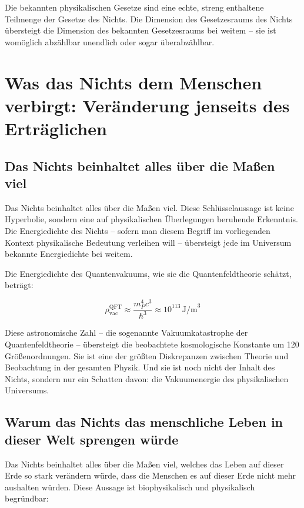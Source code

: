 ﻿\documentclass[12pt,a4paper]{report}
\begin{document}
Die bekannten physikalischen Gesetze sind eine echte, streng enthaltene Teilmenge der Gesetze des Nichts. Die Dimension des Gesetzesraums des Nichts übersteigt die Dimension des bekannten Gesetzesraums bei weitem -- sie ist womöglich abzählbar unendlich oder sogar überabzählbar.

\section{Was das Nichts dem Menschen verbirgt: Verän\-derung jenseits des Erträglichen}

\subsection{Das Nichts beinhaltet alles über die Maßen viel}

Das Nichts beinhaltet alles über die Maßen viel. Diese Schlüsselaussage ist keine Hyperbolie, sondern eine auf physikalischen Überlegungen beruhende Erkenntnis. Die Energiedichte des Nichts -- sofern man diesem Begriff im vorliegenden Kontext physikalische Bedeutung verleihen will -- übersteigt jede im Universum bekannte Energiedichte bei weitem.

Die Energiedichte des Quantenvakuums, wie sie die Quantenfeldtheorie schätzt, beträgt:

\begin{equation}
	\rho_{\text{vac}}^{\text{QFT}} \approx \frac{m_P^4 c^3}{\hbar^3} \approx 10^{113}\,\text{J/m}^3
	\label{eq:vakuum_energie}
\end{equation}

Diese astronomische Zahl -- die sogenannte \glqq Vakuumkatastrophe\grqq{} der Quantenfeldtheorie -- übersteigt die beobachtete kosmologische Konstante um 120 Größenordnungen. Sie ist eine der größten Diskrepanzen zwischen Theorie und Beobachtung in der gesamten Physik. Und sie ist noch nicht der Inhalt des Nichts, sondern nur ein Schatten davon: die Vakuumenergie des physikalischen Universums.

\subsection{Warum das Nichts das menschliche Leben in dieser Welt sprengen würde}

Das Nichts beinhaltet alles über die Maßen viel, welches das Leben auf dieser Erde so stark verändern würde, dass die Menschen es auf dieser Erde nicht mehr aushalten würden. Diese Aussage ist biophysikalisch und physikalisch begründbar:
\end{document}
